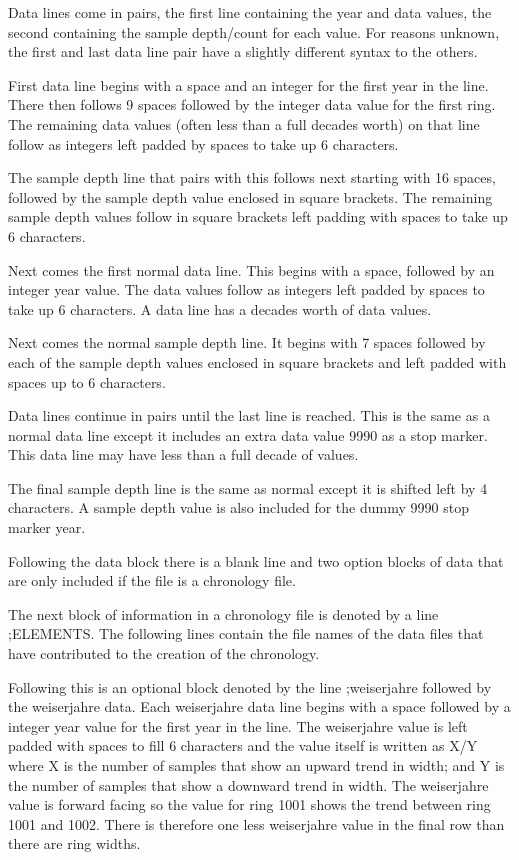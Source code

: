 \documentclass[10pt, headsepline,DIV14,BCOR0.5cm]{scrreprt}
\begin{document}
Data lines come in pairs, the first line containing the year and data values, the second containing the sample depth/count for each value. For reasons unknown, the first and last data line pair have a slightly different syntax to the others. 

\begin{itemize*}
 \item First data line begins with a space and an integer for the first year in the line. There then follows 9 spaces followed by the integer data value for the first ring. The remaining data values (often less than a full decades worth) on that line follow as integers left padded by spaces to take up 6 characters.
\item  The sample depth line that pairs with this follows next starting with 16 spaces, followed by the sample depth value enclosed in square brackets. The remaining sample depth values follow in square brackets left padding with spaces to take up 6 characters.
\item  Next comes the first normal data line. This begins with a space, followed by an integer year value. The data values follow as integers left padded by spaces to take up 6 characters. A data line has a decades worth of data values.
\item  Next comes the normal sample depth line. It begins with 7 spaces followed by each of the sample depth values enclosed in square brackets and left padded with spaces up to 6 characters.
\item  Data lines continue in pairs until the last line is reached. This is the same as a normal data line except it includes an extra data value 9990 as a stop marker. This data line may have less than a full decade of values.
\item  The final sample depth line is the same as normal except it is shifted left by 4 characters. A sample depth value is also included for the dummy 9990 stop marker year. 
\end{itemize*}

Following the data block there is a blank line and two option blocks of data that are only included if the file is a chronology file.

The next block of information in a chronology file is denoted by a line ;ELEMENTS. The following lines contain the file names of the data files that have contributed to the creation of the chronology.

Following this is an optional block denoted by the line ;weiserjahre followed by the weiserjahre data. Each weiserjahre data line begins with a space followed by a integer year value for the first year in the line. The weiserjahre value is left padded with spaces to fill 6 characters and the value itself is written as X/Y where X is the number of samples that show an upward trend in width; and Y is the number of samples that show a downward trend in width. The weiserjahre value is forward facing so the value for ring 1001 shows the trend between ring 1001 and 1002. There is therefore one less weiserjahre value in the final row than there are ring widths.
\end{document}
